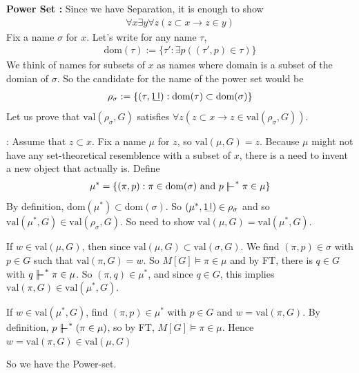 \documentclass[12pt,a4paper]{article}
\newenvironment{proof}
{\begin{changemargin}{0.5cm}{0.5cm} 
	}%
	{\end{changemargin}
}
\newenvironment{subproof}
{\begin{changemargin}{0.5cm}{0.5cm} 
	}%
	{\end{changemargin}
}
\newenvironment{p}
{\begin{proof} 
	}%
	{\end{proof}
}
\begin{document}
\begin{p}
\textbf{Power Set :} Since we have Separation, it is enough to show
\begin{align*}
\forall x \exists y \forall z (z\subset x \rightarrow z\in y)
\end{align*}
Fix a name $\sigma$ for $x$. Let's write for any name $\tau$,
\begin{align*}
\text{dom}(\tau) := \{\tau' : \exists p ((\tau', p) \in \tau) \}
\end{align*}
We think of names for subsets of $x$ as names where domain is a subset of the domian of $\sigma$. So the candidate for the name of the power set would be
\begin{align*}
\rho_{\sigma} := \{(\tau, \charac) : \text{dom}(\tau) \subset \text{dom}(\sigma) \}
\end{align*}
Let us prove that $\text{val}(\rho_{\sigma}, G)$ satisfies $\forall z (z\subset x \rightarrow z\in \text{val}(\rho_{\sigma}, G))$.
\begin{subproof}
: Assume that $z\subset x$. Fix a name $\mu$ for $z$, so $\text{val}(\mu, G) =z$. Because $\mu$ might not have any set-theoretical resemblence with a subset of $x$, there is a need to invent a new object that actually is. Define 
\begin{align*}
\mu^* = \{ (\pi, p) : \pi \in \text{dom}(\sigma) \text{ and } p\forces^* \pi \in \mu \}
\end{align*}
By definition, $\text{dom}(\mu^*) \subset \text{dom}(\sigma)$. So $(\mu^*, \charac) \in \rho_{\sigma}$ and so $\text{val}(\mu^*, G) \in \text{val}(\rho_{\sigma}, G)$. So need to show $\text{val}(\mu, G) = \text{val}(\mu^*, G)$.

\quad If $w\in \text{val}(\mu, G)$, then since $\text{val}(\mu, G) \subset \text{val}(\sigma, G)$. We find $(\pi, p) \in \sigma$ with $p\in G$ such that $\text{val}(\pi, G) =w$. So $M[G]\models \pi \in \mu$ and by FT, there is $q\in G$ with $q\forces^* \pi \in \mu$. So $(\pi, q) \in \mu^*$, and since $q\in G$, this implies $\text{val}(\pi, G) \in \text{val}(\mu^*, G)$.

\quad If $w\in \text{val}(\mu^*, G)$, find $(\pi, p) \in \mu^*$ with $p\in G$ and $w= \text{val}(\pi, G)$. By definition, $p\forces^* (\pi \in \mu)$, so by FT, $M[G] \models \pi\in \mu$. Hence $w=\text{val}(\pi, G) \in \text{val}(\mu, G)$
\end{subproof}
So we have the Power-set.

\eop
\end{p}
\s

\newday
\end{document}
